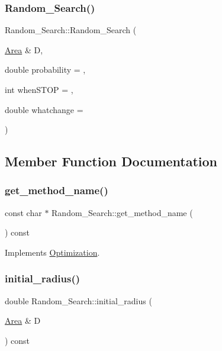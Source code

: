\subsubsection{\texorpdfstring{Random\+\_\+\+Search()}{Random\_Search()}}
{\footnotesize\ttfamily Random\+\_\+\+Search\+::\+Random\+\_\+\+Search (\begin{DoxyParamCaption}\item[{\hyperlink{class_area}{Area} \&}]{D,  }\item[{double}]{probability = {},  }\item[{int}]{when\+S\+T\+OP = {},  }\item[{double}]{whatchange = {} }\end{DoxyParamCaption})}



\subsection{Member Function Documentation}
\mbox{\label{class_random___search_a4ba44714765f2835a63765d8ac62dc35}} 
\subsubsection{\texorpdfstring{get\+\_\+method\+\_\+name()}{get\_method\_name()}}
{\footnotesize\ttfamily const char $\ast$ Random\+\_\+\+Search\+::get\+\_\+method\+\_\+name (\begin{DoxyParamCaption}{ }\end{DoxyParamCaption}) const\hspace{0.3cm}{\ttfamily [virtual]}}



Implements \hyperlink{class_optimization_a7d4cf7e7c0d0726822e6e29adecbd252}{Optimization}.

\mbox{\label{class_random___search_a4f55089354c6d2e27bef8e96a0f18f80}} 
\subsubsection{\texorpdfstring{initial\+\_\+radius()}{initial\_radius()}}
{\footnotesize\ttfamily double Random\+\_\+\+Search\+::initial\+\_\+radius (\begin{DoxyParamCaption}\item[{\hyperlink{class_area}{Area} \&}]{D }\end{DoxyParamCaption}) const}

